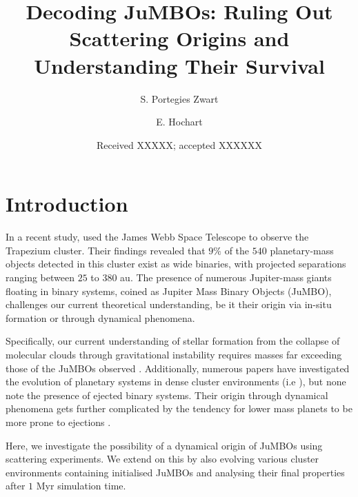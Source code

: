 \documentclass[aa]{aa}
\begin{document}
 

   \title{Decoding JuMBOs: Ruling Out Scattering Origins and Understanding Their Survival}
   \author{S. Portegies Zwart
          \and
          E. Hochart 
          }
   \date{Received XXXXX; accepted XXXXXX}

  \abstract
   { }
   { }
   { }
   { }
   {}
   \keywords{ }

   \maketitle
   
\section{Introduction}
 In a recent study, \citet{2023arXiv231001231P} used the James Webb Space Telescope to observe the Trapezium cluster. Their findings revealed that $9\%$ of the $540$ planetary-mass objects detected in this cluster exist as wide binaries, with projected separations ranging between $25$ to $380$ au. The presence of numerous Jupiter-mass giants floating in binary systems, coined as Jupiter Mass Binary Objects (JuMBO), challenges our current theoretical understanding, be it their origin via in-situ formation or through dynamical phenomena. 
 
 Specifically, our current understanding of stellar formation from the collapse of molecular clouds through gravitational instability requires masses far exceeding those of the JuMBOs observed \citep{Low1976, Boyd2005}. Additionally, numerous papers have investigated the evolution of planetary systems in dense cluster environments (i.e \citet{Rasio1996, Zheng2015, Cai2017, Dotti2019, vanElteren2019}), but none note the presence of ejected binary systems. Their origin through dynamical phenomena gets further complicated by the tendency for lower mass planets to be more prone to ejections \citep{Ford2001, Hao2013, Dotti2019}. 
 
 Here, we investigate the possibility of a dynamical origin of JuMBOs using scattering experiments. We extend on this by also evolving various cluster environments containing initialised JuMBOs and analysing their final properties after $1$ Myr simulation time.  
    
\end{document}
